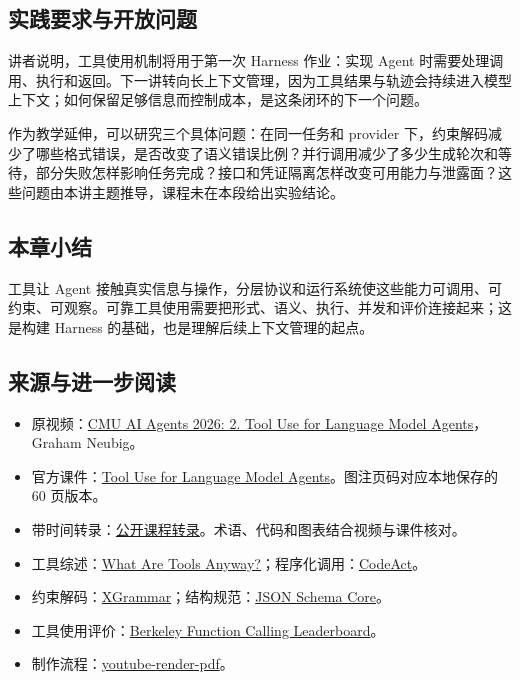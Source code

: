 \documentclass[11pt,a4paper]{article}
\begin{document}
\subsection{实践要求与开放问题}
讲者说明，工具使用机制将用于第一次 Harness 作业：实现 Agent 时需要处理调用、执行和返回。下一讲转向长上下文管理，因为工具结果与轨迹会持续进入模型上下文；如何保留足够信息而控制成本，是这条闭环的下一个问题。

作为教学延伸，可以研究三个具体问题：在同一任务和 provider 下，约束解码减少了哪些格式错误，是否改变了语义错误比例？并行调用减少了多少生成轮次和等待，部分失败怎样影响任务完成？接口和凭证隔离怎样改变可用能力与泄露面？这些问题由本讲主题推导，课程未在本段给出实验结论。

\subsection{本章小结}
工具让 Agent 接触真实信息与操作，分层协议和运行系统使这些能力可调用、可约束、可观察。可靠工具使用需要把形式、语义、执行、并发和评价连接起来；这是构建 Harness 的基础，也是理解后续上下文管理的起点。
\subsection{来源与进一步阅读}
\begin{itemize}
\item 原视频：\href{https://www.youtube.com/watch?v=jXChFB4JSyw}{CMU AI Agents 2026: 2. Tool Use for Language Model Agents}，Graham Neubig。
\item 官方课件：\href{https://www.cmu-agents.com/slides/lecture-02-tool-use.pdf}{Tool Use for Language Model Agents}。图注页码对应本地保存的 60 页版本。
\item 带时间转录：\href{https://www.usetranscribe.io/yt/jXChFB4JSyw/ai-agents-tool-use}{公开课程转录}。术语、代码和图表结合视频与课件核对。
\item 工具综述：\href{https://arxiv.org/abs/2403.15452}{What Are Tools Anyway?}；程序化调用：\href{https://arxiv.org/abs/2402.01030}{CodeAct}。
\item 约束解码：\href{https://arxiv.org/abs/2411.15100}{XGrammar}；结构规范：\href{https://json-schema.org/draft/2020-12/json-schema-core.html}{JSON Schema Core}。
\item 工具使用评价：\href{https://gorilla.cs.berkeley.edu/leaderboard.html}{Berkeley Function Calling Leaderboard}。
\item 制作流程：\href{https://github.com/wdkns/wdkns-skills/tree/main/skills/youtube-render-pdf}{youtube-render-pdf}。
\end{itemize}
\end{document}
